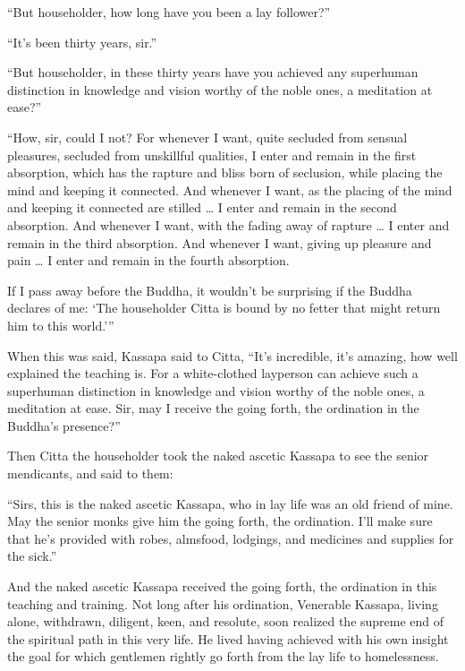 \documentclass[12pt,openany]{book}%
\begin{document}
“But householder, how long have you been a lay follower?” 

“It’s been thirty years, sir.” 

“But householder, in these thirty years have you achieved any superhuman distinction in knowledge and vision worthy of the noble ones, a meditation at ease?” 

“How, sir, could I not? For whenever I want, quite secluded from sensual pleasures, secluded from unskillful qualities, I enter and remain in the first absorption, which has the rapture and bliss born of seclusion, while placing the mind and keeping it connected. And whenever I want, as the placing of the mind and keeping it connected are stilled … I enter and remain in the second absorption. And whenever I want, with the fading away of rapture … I enter and remain in the third absorption. And whenever I want, giving up pleasure and pain … I enter and remain in the fourth absorption. 

If I pass away before the Buddha, it wouldn’t be surprising if the Buddha declares of me: ‘The householder Citta is bound by no fetter that might return him to this world.’” 

When this was said, Kassapa said to Citta, “It’s incredible, it’s amazing, how well explained the teaching is. For a white-clothed layperson can achieve such a superhuman distinction in knowledge and vision worthy of the noble ones, a meditation at ease. Sir, may I receive the going forth, the ordination in the Buddha’s presence?” 

Then Citta the householder took the naked ascetic Kassapa to see the senior mendicants, and said to them: 

“Sirs, this is the naked ascetic Kassapa, who in lay life was an old friend of mine. May the senior monks give him the going forth, the ordination. I’ll make sure that he’s provided with robes, almsfood, lodgings, and medicines and supplies for the sick.” 

And the naked ascetic Kassapa received the going forth, the ordination in this teaching and training. Not long after his ordination, Venerable Kassapa, living alone, withdrawn, diligent, keen, and resolute, soon realized the supreme end of the spiritual path in this very life. He lived having achieved with his own insight the goal for which gentlemen rightly go forth from the lay life to homelessness. 
\end{document}
